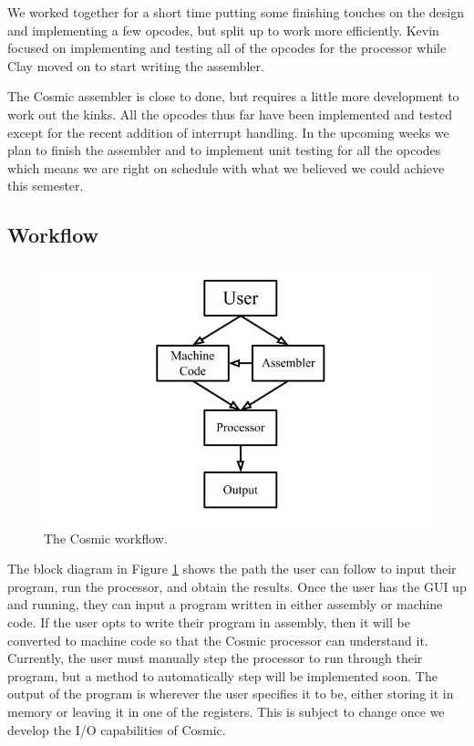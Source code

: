 \documentclass[conference]{IEEEtran}
\begin{document}
We worked together for a short time putting some finishing touches on the design and implementing a few opcodes, but split up to work more efficiently. Kevin focused on implementing and testing all of the opcodes for the processor while Clay moved on to start writing the assembler.

The Cosmic assembler is close to done, but requires a little more development to work out the kinks. All the opcodes thus far have been implemented and tested except for the recent addition of interrupt handling. In the upcoming weeks we plan to finish the assembler and to implement unit testing for all the opcodes which means we are right on schedule with what we believed we could achieve this semester.

\subsection{Workflow}
\begin{figure}[h!]
	\includegraphics[width=\linewidth]{block_dia.jpg}
	\caption{The Cosmic workflow.}
	\label{fig:The Cosmic Workflow}
\end{figure}

The block diagram in Figure \ref{fig:The Cosmic Workflow} shows the path the user can follow to input their program, run the processor, and obtain the results. Once the user has the GUI up and running, they can input a program written in either assembly or machine code. If the user opts to write their program in assembly, then it will be converted to machine code so that the Cosmic processor can understand it. Currently, the user must manually step the processor to run through their program, but a method to automatically step will be implemented soon. The output of the program is wherever the user specifies it to be, either storing it in memory or leaving it in one of the registers. This is subject to change once we develop the I/O capabilities of Cosmic.
\end{document}
